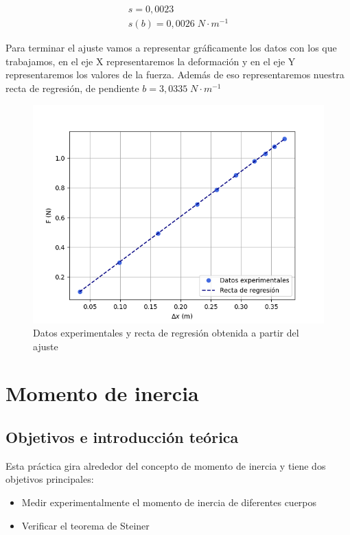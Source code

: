 \documentclass[a4paper,12pt,titlepage]{report}
\begin{document}
\begin{equation}
    \begin{gathered}
        s = 0,0023 \\
        s(b) = 0,0026 \; N\cdot m^{-1}
    \end{gathered}
\end{equation}

Para terminar el ajuste vamos a representar gráficamente los datos con los que trabajamos, en el eje X representaremos la deformación y en el eje Y representaremos los valores de la fuerza. Además de eso representaremos nuestra recta de regresión, de pendiente $b=3,0335\; N\cdot m^{-1}$

\begin{figure}[h!]
    \centering
    \includegraphics[width=0.75\linewidth]{Images/RegEstatico.png}
    \caption{Datos experimentales y recta de regresión obtenida a partir del ajuste}
\end{figure}

\chapter{Momento de inercia}

\section{Objetivos e introducción teórica}

Esta práctica gira alrededor del concepto de momento de inercia y tiene dos objetivos principales:

\begin{itemize}
    \item Medir experimentalmente el momento de inercia de diferentes cuerpos
    \item Verificar el teorema de Steiner
\end{itemize}
\end{document}
